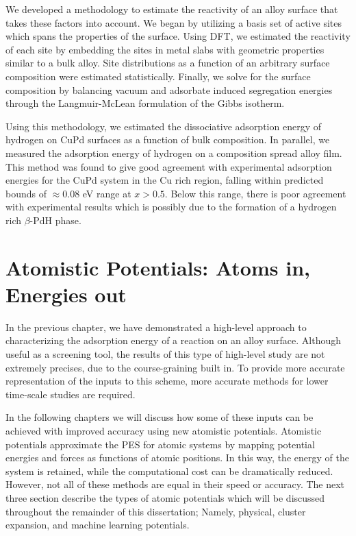 \documentclass[12pt,oneside]{cmuthesis}
\begin{document}
We developed a methodology to estimate the reactivity of an alloy surface that takes these factors into account. We began by utilizing a basis set of active sites which spans the properties of the surface. Using DFT, we estimated the reactivity of each site by embedding the sites in metal slabs with geometric properties similar to a bulk alloy. Site distributions as a function of an arbitrary surface composition were estimated statistically. Finally, we solve for the surface composition by balancing vacuum and adsorbate induced segregation energies through the Langmuir-McLean formulation of the Gibbs isotherm.

Using this methodology, we estimated the dissociative adsorption energy of hydrogen on CuPd surfaces as a function of bulk composition. In parallel, we measured the adsorption energy of hydrogen on a composition spread alloy film.  This method was found to give good agreement with experimental adsorption energies for the CuPd system in the Cu rich region, falling within predicted bounds of \(\approx 0.08\) eV range at \(x > 0.5\). Below this range, there is poor agreement with experimental results which is possibly due to the formation of a hydrogen rich \(\beta\)-PdH phase.

\chapter{Atomistic Potentials: Atoms in, Energies out}
\label{sec:ch3}
In the previous chapter, we have demonstrated a high-level approach to characterizing the adsorption energy of a reaction on an alloy surface. Although useful as a screening tool, the results of this type of high-level study are not extremely precises, due to the course-graining built in. To provide more accurate representation of the inputs to this scheme, more accurate methods for lower time-scale studies are required.

In the following chapters we will discuss how some of these inputs can be achieved with improved accuracy using new atomistic potentials. Atomistic potentials approximate the PES for atomic systems by mapping potential energies and forces as functions of atomic positions. In this way, the energy of the system is retained, while the computational cost can be dramatically reduced. However, not all of these methods are equal in their speed or accuracy. The next three section describe the types of atomic potentials which will be discussed throughout the remainder of this dissertation; Namely, physical, cluster expansion, and machine learning potentials.
\end{document}

